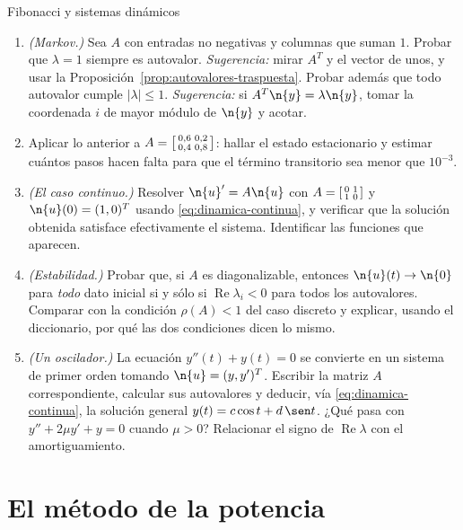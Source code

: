 \begin{entrega}{Fibonacci y sistemas dinámicos}
\begin{enumerate}[label=\textbf{(\alph*)},itemsep=3pt,topsep=4pt]
\item \emph{(Markov.)} Sea $A$ con entradas no negativas y columnas que suman $1$.
Probar que $\lambda=1$ siempre es autovalor. \emph{Sugerencia:} mirar $A^T$ y el vector
de unos, y usar la Proposición~\ref{prop:autovalores-traspuesta}. Probar además que todo
autovalor cumple $|\lambda|\le1$.
\emph{Sugerencia:} si $A^T\n{y}=\lambda\n{y}$, tomar la coordenada $i$ de mayor módulo
de $\n{y}$ y acotar.

\item Aplicar lo anterior a
$A=\begin{bsmallmatrix}0{,}6&0{,}2\\ 0{,}4&0{,}8\end{bsmallmatrix}$: hallar el estado
estacionario y estimar cuántos pasos hacen falta para que el término transitorio sea
menor que $10^{-3}$.

\item \emph{(El caso continuo.)} Resolver
$\n{u}'=A\n{u}$ con $A=\begin{bsmallmatrix}0&1\\ 1&0\end{bsmallmatrix}$ y
$\n{u}(0)=(1,0)^T$ usando \eqref{eq:dinamica-continua}, y verificar que la solución
obtenida satisface efectivamente el sistema. Identificar las funciones que aparecen.

\item \emph{(Estabilidad.)} Probar que, si $A$ es diagonalizable, entonces
$\n{u}(t)\to\n{0}$ para \emph{todo} dato inicial si y sólo si
$\operatorname{Re}\lambda_i<0$ para todos los autovalores. Comparar con la condición
$\rho(A)<1$ del caso discreto y explicar, usando el diccionario, por qué las dos
condiciones dicen lo mismo.

\item \emph{(Un oscilador.)} La ecuación $y''(t)+y(t)=0$ se convierte en un sistema de
primer orden tomando $\n{u}=(y,y')^T$. Escribir la matriz $A$ correspondiente, calcular
sus autovalores y deducir, vía \eqref{eq:dinamica-continua}, la solución general
$y(t)=c\cos t+d\,\sen t$. ¿Qué pasa con $y''+2\mu y'+y=0$ cuando $\mu>0$? Relacionar el
signo de $\operatorname{Re}\lambda$ con el amortiguamiento.
\end{enumerate}

\medskip
{}
\end{entrega}

\section{El método de la potencia}
\label{sec:metodo-potencia}

